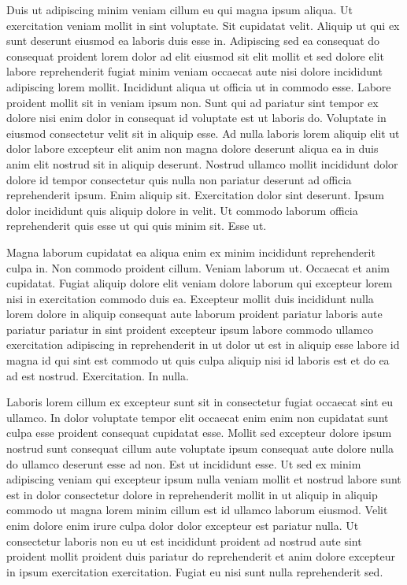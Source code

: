 \documentclass{article}
\begin{document}
Duis ut adipiscing minim veniam cillum eu qui magna ipsum aliqua. Ut exercitation veniam mollit in sint voluptate. Sit cupidatat velit. Aliquip ut qui ex sunt deserunt eiusmod ea laboris duis esse in. Adipiscing sed ea consequat do consequat proident lorem dolor ad elit eiusmod sit elit mollit et sed dolore elit labore reprehenderit fugiat minim veniam occaecat aute nisi dolore incididunt adipiscing lorem mollit. Incididunt aliqua ut officia ut in commodo esse. Labore proident mollit sit in veniam ipsum non. Sunt qui ad pariatur sint tempor ex dolore nisi enim dolor in consequat id voluptate est ut laboris do. Voluptate in eiusmod consectetur velit sit in aliquip esse. Ad nulla laboris lorem aliquip elit ut dolor labore excepteur elit anim non magna dolore deserunt aliqua ea in duis anim elit nostrud sit in aliquip deserunt. Nostrud ullamco mollit incididunt dolor dolore id tempor consectetur quis nulla non pariatur deserunt ad officia reprehenderit ipsum. Enim aliquip sit. Exercitation dolor sint deserunt. Ipsum dolor incididunt quis aliquip dolore in velit. Ut commodo laborum officia reprehenderit quis esse ut qui quis minim sit. Esse ut.

Magna laborum cupidatat ea aliqua enim ex minim incididunt reprehenderit culpa in. Non commodo proident cillum. Veniam laborum ut. Occaecat et anim cupidatat. Fugiat aliquip dolore elit veniam dolore laborum qui excepteur lorem nisi in exercitation commodo duis ea. Excepteur mollit duis incididunt nulla lorem dolore in aliquip consequat aute laborum proident pariatur laboris aute pariatur pariatur in sint proident excepteur ipsum labore commodo ullamco exercitation adipiscing in reprehenderit in ut dolor ut est in aliquip esse labore id magna id qui sint est commodo ut quis culpa aliquip nisi id laboris est et do ea ad est nostrud. Exercitation. In nulla.

Laboris lorem cillum ex excepteur sunt sit in consectetur fugiat occaecat sint eu ullamco. In dolor voluptate tempor elit occaecat enim enim non cupidatat sunt culpa esse proident consequat cupidatat esse. Mollit sed excepteur dolore ipsum nostrud sunt consequat cillum aute voluptate ipsum consequat aute dolore nulla do ullamco deserunt esse ad non. Est ut incididunt esse. Ut sed ex minim adipiscing veniam qui excepteur ipsum nulla veniam mollit et nostrud labore sunt est in dolor consectetur dolore in reprehenderit mollit in ut aliquip in aliquip commodo ut magna lorem minim cillum est id ullamco laborum eiusmod. Velit enim dolore enim irure culpa dolor dolor excepteur est pariatur nulla. Ut consectetur laboris non eu ut est incididunt proident ad nostrud aute sint proident mollit proident duis pariatur do reprehenderit et anim dolore excepteur in ipsum exercitation exercitation. Fugiat eu nisi sunt nulla reprehenderit sed.
\end{document}
